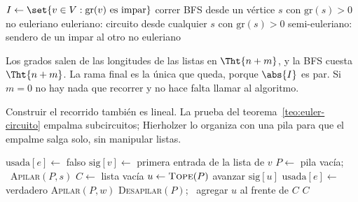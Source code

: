 \documentclass[11pt,letterpaper]{article}
\begin{document}
\begin{algorithm}[H]
\caption{\textsc{Tipo-Euler}$(G)$}
\label{alg:tipo-euler}
\begin{algorithmic}[1]
  \State $I \gets \set{v \in V : \text{gr}(v) \text{ es impar}}$
  \State correr BFS desde un vértice $s$ con $\text{gr}(s) > 0$
    \State \Return no euleriano 
    \State \Return euleriano: circuito desde cualquier $s$ con
           $\text{gr}(s) > 0$
    \State \Return semi-euleriano: sendero de un impar al otro
  \Else
    \State \Return no euleriano 
  \EndIf
\EndProcedure
\end{algorithmic}
\end{algorithm}

Los grados salen de las longitudes de las listas en $\Tht{n + m}$, y
la BFS cuesta $\Tht{n + m}$. La rama final es la única que queda,
porque $\abs{I}$ es par. Si $m = 0$ no hay nada que recorrer y no
hace falta llamar al algoritmo.

Construir el recorrido también es lineal. La prueba del
teorema~\ref{teo:euler-circuito} empalma subcircuitos; Hierholzer lo
organiza con una pila para que el empalme salga solo, sin manipular
listas.

\begin{algorithm}[H]
\caption{\textsc{Hierholzer}$(G, s)$}
\label{alg:hierholzer}
\begin{algorithmic}[1]
    \State $\text{usada}[e] \gets$ falso
  \EndFor
    \State $\text{sig}[v] \gets$ primera entrada de la lista de $v$
  \EndFor
  \State $P \gets$ pila vacía; \ \textsc{Apilar}$(P, s)$
  \State $C \gets$ lista vacía
    \State $u \gets \textsc{Tope}(P)$
      \State avanzar $\text{sig}[u]$
    \EndWhile
      \State $\text{usada}[e] \gets$ verdadero
      \State \textsc{Apilar}$(P, w)$ 
    \Else {}
      \State \textsc{Desapilar}$(P)$; \ agregar $u$ al frente de $C$
    \EndIf
  \EndWhile
  \State \Return $C$
\EndProcedure
\end{algorithmic}
\end{algorithm}
\end{document}
